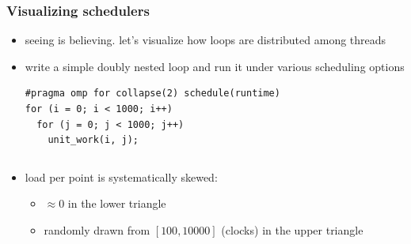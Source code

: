 \documentclass[12pt,dvipdfmx]{beamer}
\begin{document}
\iffalse
\begin{frame}[fragile]
\frametitle{Visualizing schedulers}
\begin{itemize}
\item seeing is believing. let's visualize how loops are distributed among threads
\item write a simple doubly nested loop and run it under various scheduling options
\begin{lstlisting}
#pragma omp for collapse(2) schedule(runtime)
for (i = 0; i < 1000; i++)
  for (j = 0; j < 1000; j++)
    unit_work(i, j);
\end{lstlisting}
\end{itemize}


\begin{columns}
\begin{column}{0.6\textwidth}
\begin{itemize}
\item load per point is systematically skewed:
  \begin{itemize}
  \item $\approx 0$ in the lower triangle
  \item randomly drawn from $[100,10000]$ (clocks) in the upper triangle
  \end{itemize}
\end{itemize}  
\end{column}

\begin{column}{0.4\textwidth}
\begin{center}
\def\svgwidth{\textwidth}
{\scriptsize }
\end{center}
\end{column}
\end{columns}
\end{frame}
\end{document}
